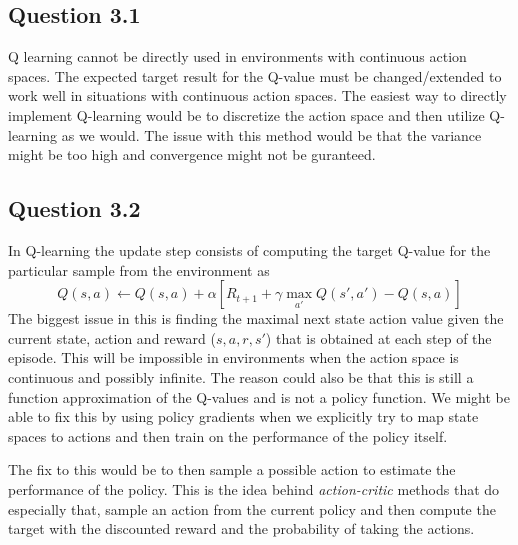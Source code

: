 \documentclass[a4paper]{article}
\begin{document}
\subsection*{Question 3.1}
Q learning cannot be directly used in environments with continuous action spaces. The expected target result for the Q-value must be changed/extended to work well in situations with continuous action spaces. The easiest way to directly implement Q-learning would be to discretize the action space and then utilize Q-learning as we would. The issue with this method would be that the variance might be too high and convergence might not be guranteed. 
\subsection*{Question 3.2}
In Q-learning the update step consists of computing the target Q-value for the particular sample from the environment as 
\[ Q(s,a) \leftarrow Q(s,a) + \alpha\left[ R_{t+1} +\gamma\max_{a'} Q(s',a') - Q(s,a) \right]\] 
The biggest issue in this is finding the maximal next state action value given the current state, action and reward ($s,a,r,s'$) that is obtained at each step of the episode. This will be impossible in environments when the action space is continuous and possibly infinite. The reason could also be that this is still a function approximation of the Q-values and is not a policy function. We might be able to fix this by using policy gradients when we explicitly try to map state spaces to actions and then train on the performance of the policy itself.

The fix to this would be to then sample a possible action to estimate the performance of the policy. This is the idea behind \textit{action-critic} methods that do especially that, sample an action from the current policy and then compute the target with the discounted reward and the probability of taking the actions. 
\end{document}
